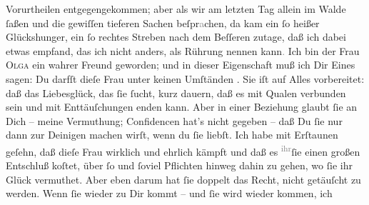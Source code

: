 \begin{ledgroupsized}[t]{13cm}
               Vorurtheilen {\pb}entgegengekommen; aber als wir am
               letzten Tag allein im Walde ſaßen und die gewiſſen tieferen Sachen
                  beſpr\textcolor{gray}{a}chen, da kam ein ſo heißer Glückshunger, ein ſo rechtes
               Streben nach dem Beſſeren zutage, daß ich dabei etwas empfand, das ich nicht anders,
               als Rührung nennen kann\textcolor{gray}{.} Ich bin der Frau \textsc{Olga} ein wahrer Freund geworden; und in dieser Eigenschaft muß ich Dir Eines sagen:
               Du darfſt dieſe Frau unter
               keinen Umſtänden \label{K_L02648-3v}\label{K_L02648-3h}. Sie iſt auf Alles vorbereitet: daß das Liebesglück, das
               ſie ſucht, kurz dauern, daß es mit Qualen verbunden sein und mit Enttäuſchungen enden
               kann. Aber in einer Beziehung glaubt ſie an Dich – meine Vermuthung; {\pb}Confidencen hat’s nicht gegeben – daß Du ſie nur
               dann zur Deinigen machen wirſt, wenn du ſie liebſt. Ich habe mit Erſtaunen geſehn,
               daß dieſe Frau wirklich und
               ehrlich kämpft und daß es \substVorne{}\textsuperscript{\textcolor{gray}{ihr}}\substDazwischen{}ſie\substHinten{} einen großen Entschluß koſtet, über ſo und ſoviel Pflichten hinweg dahin zu
               gehen, wo ſie ihr Glück vermuthet. Aber eben darum hat ſie doppelt das Recht, nicht
               getäuſcht zu werden. Wenn ſie wieder zu Dir kommt – und ſie wird wieder kommen, ich

\end{ledgroupsized}
